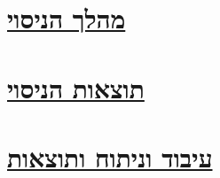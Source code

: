 \documentclass[a4paper, 12pt]{article}
\begin{document}
    \section{\underline{מהלך הניסוי}}
    \begin{spacing}{1.15}
        \begin{flushright}

        \end{flushright}
    \end{spacing}

    \pagebreak 

    \section{\underline{תוצאות הניסוי}}
    \begin{spacing}{1.15}
        \begin{flushright}

        \end{flushright}
    \end{spacing}

    \pagebreak 

    \section{\underline{עיבוד וניתוח ותוצאות}}
    \begin{spacing}{1.15}
        \begin{flushright}

        \end{flushright}
    \end{spacing}
\end{document}

